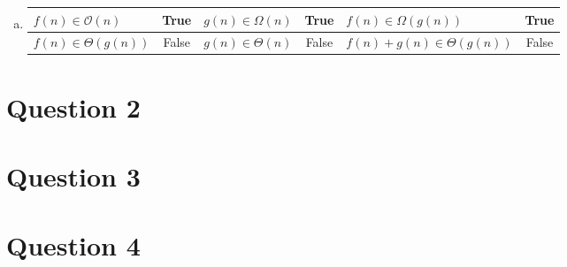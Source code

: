 \documentclass[12pt]{article}
\begin{document}
\begin{enumerate}[a.]
    \item

    \begin{tabular}{|l|c|l|c|l|c|}
        \hline
        $f(n) \in \mathcal{O}(n)$ & True & $g(n) \in \Omega(n)$ & True & $f(n) \in \Omega(g(n))$ & True\\
        \hline
        $f(n) \in \Theta(g(n))$ & False & $g(n) \in \Theta(n)$ & False & $f(n) + g(n) \in \Theta(g(n))$ & False\\
        \hline
    \end{tabular}

\end{enumerate}

\section*{Question 2}

\section*{Question 3}

\section*{Question 4}
\end{document}
